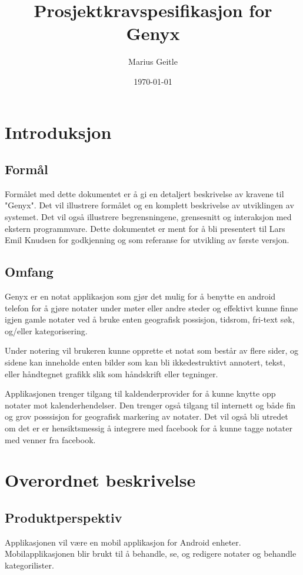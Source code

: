 \documentclass[a4paper, 12pt]{article}
\begin{document}
\title{Prosjektkravspesifikasjon for Genyx}
\author{Marius Geitle}
\date{\today}

\maketitle
{}


\section{Introduksjon}
\subsection{Formål}
Formålet med dette dokumentet er å gi en detaljert beskrivelse av kravene til "Genyx". Det vil illustrere formålet og en komplett beskrivelse av utviklingen av systemet. Det vil også illustrere begrensningene, grensesnitt og interaksjon med ekstern programmvare. Dette dokumentet er ment for å bli presentert til Lars Emil Knudsen for godkjenning og som referanse for utvikling av første versjon.


\subsection{Omfang}
Genyx er en notat applikasjon som gjør det mulig for å benytte en android telefon for å gjøre notater under møter eller andre steder og effektivt kunne finne igjen gamle notater ved å bruke enten geografisk possisjon, tidsrom, fri-text søk, og/eller kategorisering.

Under notering vil brukeren kunne opprette et notat som består av flere sider, og sidene kan inneholde enten bilder som kan bli ikkedestruktivt annotert, tekst, eller håndtegnet grafikk slik som håndskrift eller tegninger.

Applikasjonen trenger tilgang til kaldenderprovider for å kunne knytte opp notater mot kalenderhendelser. Den trenger også tilgang til internett og både fin og grov posssisjon for geografisk markering av notater. Det vil også bli utredet om det er er hensiktsmessig å integrere med facebook for å kunne tagge notater med venner fra facebook.

\section{Overordnet beskrivelse}
\subsection{Produktperspektiv}
Applikasjonen vil være en mobil applikasjon for Android enheter. Mobilapplikasjonen blir brukt til å behandle, se, og redigere notater og behandle kategorilister.
\end{document}
